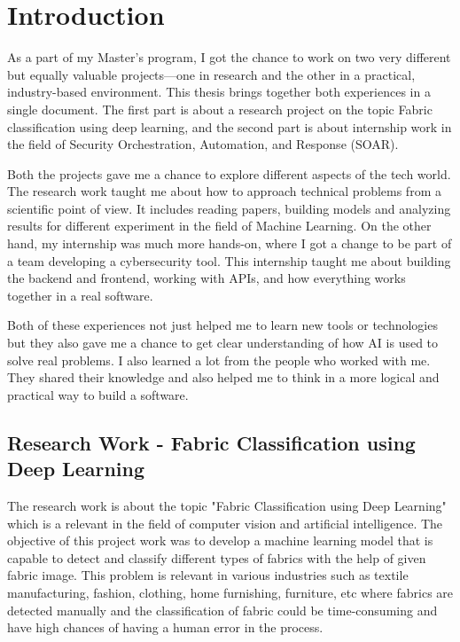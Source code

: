 \chapter{Introduction}

As a part of my Master’s program, I got the chance to work on two very different but equally valuable projects—one in research and the other in a practical, industry-based environment. This thesis brings together both experiences in a single document. The first part is about a research project on the topic Fabric classification using deep learning, and the second part is about internship work in the field of Security Orchestration, Automation, and Response (SOAR).

Both the projects gave me a chance to explore different aspects of the tech world. The research work taught me about how to approach technical problems from a scientific point of view. It includes reading papers, building models and analyzing results for different experiment in the field of Machine Learning. On the other hand, my internship was much more hands-on, where I got a change to be part of a team developing a cybersecurity tool. This internship taught me about building the backend and frontend, working with APIs, and how everything works together in a real software.

Both of these experiences not just helped me to learn new tools or technologies but they also gave me a chance to get clear understanding of how AI is used to solve real problems. I also learned a lot from the people who worked with me. They shared their knowledge and also helped me to think in a more logical and practical way to build a software.

\section{Research Work - Fabric Classification using Deep Learning}

The research work is about the topic "Fabric Classification using Deep Learning" which is a relevant  in the field of computer vision and artificial intelligence. The objective of this project work was to develop a machine learning model that is capable to detect and classify different types of fabrics with the help of given fabric image. This problem is relevant in various industries such as textile manufacturing, fashion, clothing, home furnishing, furniture, etc where fabrics are detected manually and the classification of fabric could be time-consuming and have high chances of having a human error in the process.

